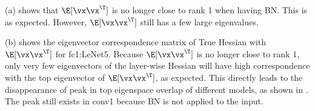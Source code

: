 (a) shows that $\E[\vx\vx^\T]$ is no longer close to rank 1 when having BN. This is as expected. However, $\E[\vx\vx^\T]$ still has a few large eigenvalues.

(b) shows the eigenvector correspondence matrix of True Hessian with $\E[\vx\vx^\T]$ for fc1:LeNet5. Because $\E[\vx\vx^\T]$ is no longer close to rank 1, only very few eigenvectors of the layer-wise Hessian will have high correspondence with the top eigenvector of $\E[\vx\vx^\T]$, as expected. This directly leads to the disappearance of peak in top eigenspace overlap of different models, as shown in . The peak still exists in conv1 because BN is not applied to the input.


